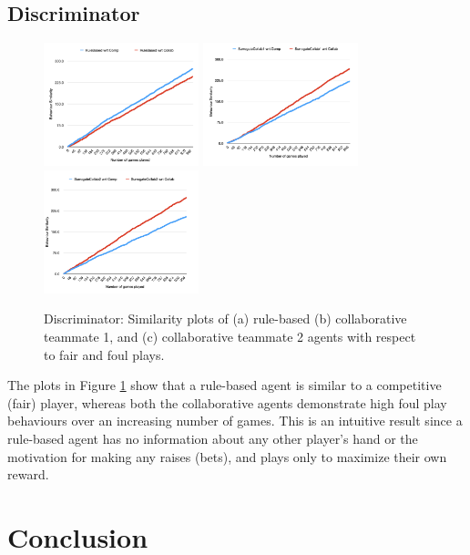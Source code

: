 \documentclass{article}
\begin{document}
\subsection{Discriminator} %

\begin{figure}[h]
    \centering
    \includegraphics[width=4.5cm]{./images/rulebased.png}
    \includegraphics[width=4.5cm]{./images/cheater1.png}
    \includegraphics[width=4.5cm]{./images/cheater2.png}
    \caption{Discriminator: Similarity plots of (a) rule-based (b) collaborative teammate 1, and (c) collaborative teammate 2 agents with respect to fair and foul plays.}
    \label{fig:discriminator}
\end{figure}

The plots in Figure \ref{fig:discriminator} show that a rule-based agent is similar to a competitive (fair) player, whereas both the collaborative agents demonstrate high foul play behaviours over an increasing number of games. This is an intuitive result since a rule-based agent has no information about any other player's hand or the motivation for making any raises (bets), and plays only to maximize their own reward.

\section{Conclusion} %
\end{document}
